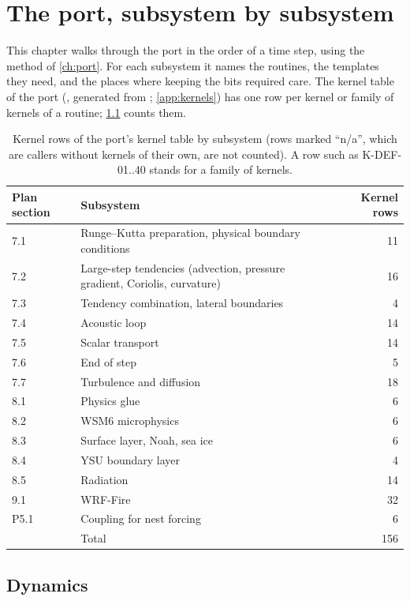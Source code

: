 \chapter{The port, subsystem by subsystem}\label{ch:subsys}

This chapter walks through the port in the order of a time step, using the method of \cref{ch:port}. For each
subsystem it names the routines, the templates they need, and the places where keeping the bits required care. The
kernel table of the port (, generated from ; \cref{app:kernels}) has one row
per kernel or family of kernels of a routine; \cref{tab:kernel-rows} counts them.

\begin{table}[ht]
\centering
\small
\begin{tabular}{llr}
\toprule
Plan section & Subsystem & Kernel rows \\
\midrule
7.1 & Runge--Kutta preparation, physical boundary conditions & 11 \\
7.2 & Large-step tendencies (advection, pressure gradient, Coriolis, curvature) & 16 \\
7.3 & Tendency combination, lateral boundaries & 4 \\
7.4 & Acoustic loop & 14 \\
7.5 & Scalar transport & 14 \\
7.6 & End of step & 5 \\
7.7 & Turbulence and diffusion & 18 \\
8.1 & Physics glue & 6 \\
8.2 & WSM6 microphysics & 6 \\
8.3 & Surface layer, Noah, sea ice & 6 \\
8.4 & YSU boundary layer & 4 \\
8.5 & Radiation & 14 \\
9.1 & WRF-Fire & 32 \\
P5.1 & Coupling for nest forcing & 6 \\
\midrule
 & Total & 156 \\
\bottomrule
\end{tabular}
\caption{Kernel rows of the port's kernel table by subsystem (rows marked ``n/a'', which are callers without kernels
of their own, are not counted). A row such as K-DEF-01..40 stands for a family of kernels.}
\label{tab:kernel-rows}
\end{table}

\section{Dynamics}

